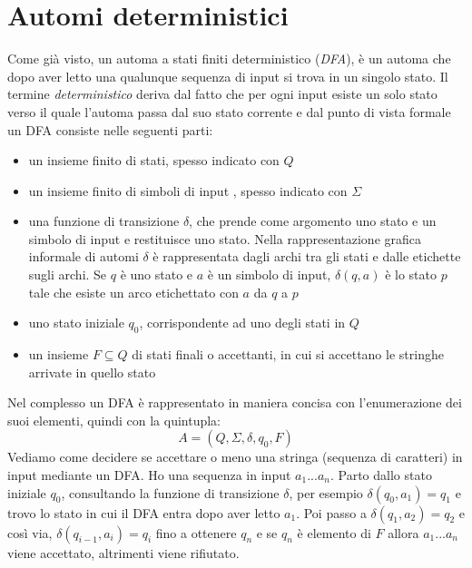 \documentclass[a4paper]{book}
\theoremstyle{definition}%
\begin{document}
\section{Automi deterministici}
Come già visto, un automa a stati finiti deterministico (\textit{DFA}), è un automa che dopo aver letto
una qualunque sequenza di input si trova in un singolo stato.\newline
Il termine \textit{deterministico} deriva dal fatto che per ogni input esiste un solo stato verso il quale l'automa passa dal suo stato corrente
e dal punto di vista formale un DFA consiste nelle seguenti parti:
\begin{itemize}
\item un insieme finito di stati, spesso indicato con $Q$
\item un insieme finito di simboli di input , spesso indicato con $\Sigma$
\item una funzione di transizione $\delta$, che prende come argomento uno stato e un simbolo di input e restituisce uno stato. \newline
Nella rappresentazione grafica informale di automi $\delta$ è rappresentata dagli archi tra gli stati e dalle etichette sugli archi. Se $q$ è uno stato
e $a$ è un simbolo di input, $\delta(q,a)$ è lo stato $p$ tale che esiste un arco etichettato con $a$ da $q$ a $p$
\item uno stato iniziale $q_0$, corrispondente ad uno degli stati in $Q$
\item un insieme $F \subseteq Q$ di stati finali o accettanti, in cui si accettano le stringhe
      arrivate in quello stato
\end{itemize}
Nel complesso un DFA è rappresentato in maniera concisa con l'enumerazione dei suoi elementi, quindi con la quintupla:
\[ A=(Q,\Sigma,\delta,q_0,F) \]
Vediamo come decidere se accettare o meno una stringa (sequenza di caratteri) in input mediante un DFA.\newline
Ho una sequenza in input $a_1...a_n$. Parto dallo stato iniziale $q_0$, consultando la funzione di transizione $\delta$, per esempio
$\delta(q_0,a_1)=q_1$ e trovo lo stato in cui il DFA entra dopo aver letto $a_1$.\newline
Poi passo a $\delta(q_1,a_2)=q_2$ e così via, $\delta(q_{i-1},a_i)=q_i$ fino a ottenere $q_n$
e se $q_n$ è elemento di $F$ allora $a_1...a_n$ viene accettato, altrimenti viene rifiutato.
\end{document}
